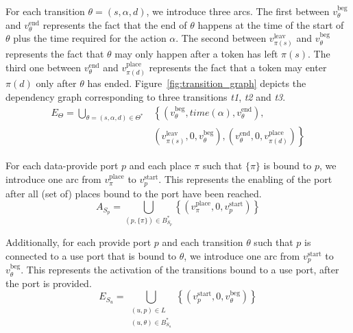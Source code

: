 

For each transition $\theta = (s, \alpha, d)$, we introduce
three arcs. The first between $v_\theta^\text{beg}$ and $v_\theta^\text{end}$
represents the fact that the end of $\theta$ happens at the time of the
start of $\theta$ plus the time required for the action $\alpha$. The second between $v_{\pi(s)}^\text{leav}$
and $v_\theta^\text{beg}$ represents the fact that $\theta$ may only
happen after a token has left $\pi(s)$. The third one between $v_\theta^\text{end}$ and
$v_{\pi(d)}^\text{place}$ represents the fact that a token may enter $\pi(d)$ only
after $\theta$ has ended.
Figure~\ref{fig:transition_graph} depicts the dependency graph corresponding to three
transitions \emph{t1}, \emph{t2} and \emph{t3}.
\begin{align*}
E_{\Theta}=\bigcup_{\theta=(s,\alpha,d)\in\Theta^*} & \left\{ \left(v_\theta^\text{beg},time(\alpha),v_\theta^\text{end}\right),\right.\\
 & \left(v_{\pi(s)}^\text{leav},0,v_\theta^\text{beg}\right),\left. \left(v_\theta^\text{end},0,v_{\pi(d)}^\text{place}\right)\right\}
\end{align*}




For each data-provide port $p$ and each place $\pi$ such that
$\{\pi\}$ is bound to $p$, we introduce one arc from
$v_\pi^\text{place}$ to $v_p^\text{start}$. This represents the
enabling of the port after all (set of) places bound to the port
have been reached.
\[
A_{S_p}= \bigcup_{(p,\{\pi\})\in B_{S_p}^*}\left\{ \left(v_\pi^\text{place},0,v_p^\text{start}\right)\right\}
\]

Additionally, for each provide port $p$ and each transition
$\theta$ such that $p$ is connected to a use port that is bound
to $\theta$, we introduce one arc from $v_p^\text{start}$ to
$v_\theta^\text{beg}$. This represents the activation of the transitions
bound to a use port, after the port is provided.
\[
E_{S_u} = \bigcup_{\substack{(u,p)\in L \\ (u,\theta)\in B_{S_u}^*}} \left\{ \left(v_p^\text{start},0,v_\theta^\text{beg}\right)\right\}
\]

